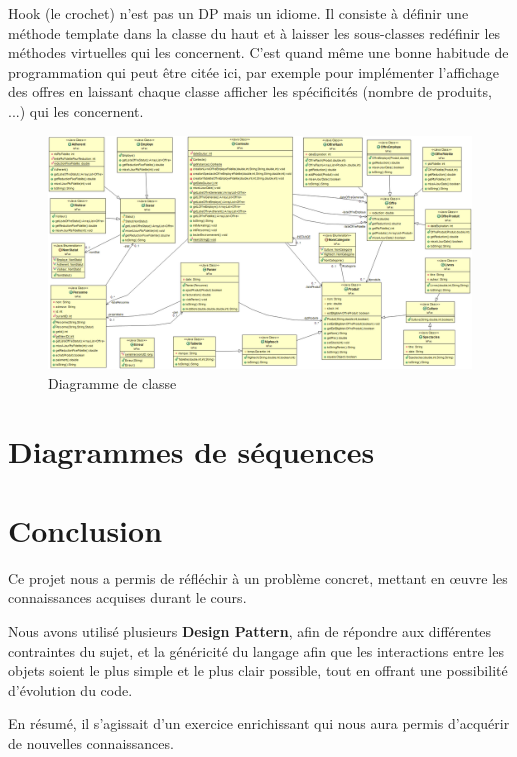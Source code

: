 \documentclass{article}
\begin{document}
{
Hook (le crochet) n'est pas un DP mais un idiome. Il consiste à définir une méthode template dans
la classe du haut et à laisser les sous-classes redéfinir les méthodes virtuelles qui les
concernent. C'est quand même une bonne habitude de programmation qui peut être citée ici,
par exemple pour implémenter l'affichage des offres en laissant chaque classe afficher les
spécificités (nombre de produits, ...) qui les concernent.
}

\begin{figure}
	\vfill\hfill %
	\includegraphics[scale=0.36]{diagUML.png}
	\hfill\vfill %
	\caption{Diagramme de classe}
\end{figure}

\clearpage %

\section*{Diagrammes de séquences}

\clearpage %

\vfill
\section*{Conclusion}

Ce projet nous a permis de réfléchir à un problème concret, mettant en œuvre les connaissances acquises durant le cours.
\par
Nous avons utilisé plusieurs \textbf{Design Pattern}, afin de répondre aux différentes contraintes du sujet,
et la généricité du langage afin que les interactions entre les objets soient le plus simple et le plus clair possible, tout en offrant une possibilité d'évolution du code.
\par
En résumé, il s'agissait d'un exercice enrichissant qui nous aura permis d'acquérir de nouvelles connaissances.
\end{document}
